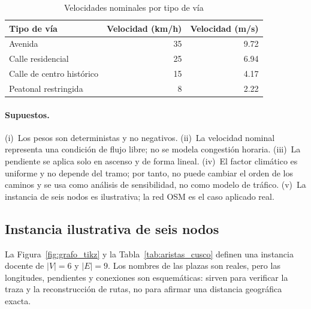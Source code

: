 \begin{table}[H]
    \centering
    \fontsize{9.5}{11.5}\selectfont
    \caption{Velocidades nominales por tipo de vía}
    \label{tab:velocidades}
    \begin{tabular}{@{}lrr@{}}
        \toprule
        \textbf{Tipo de vía} & \textbf{Velocidad (km/h)} & \textbf{Velocidad (m/s)} \\
        \midrule
        Avenida & 35 & 9.72 \\
        Calle residencial & 25 & 6.94 \\
        Calle de centro histórico & 15 & 4.17 \\
        Peatonal restringida & 8 & 2.22 \\
        \bottomrule
    \end{tabular}
\end{table}

\paragraph{Supuestos.} (i)~Los pesos son deterministas y no negativos. (ii)~La velocidad nominal representa una condición de flujo libre; no se modela congestión horaria. (iii)~La pendiente se aplica solo en ascenso y de forma lineal. (iv)~El factor climático es uniforme y no depende del tramo; por tanto, no puede cambiar el orden de los caminos y se usa como análisis de sensibilidad, no como modelo de tráfico. (v)~La instancia de seis nodos es ilustrativa; la red OSM es el caso aplicado real.

\subsection{Instancia ilustrativa de seis nodos}
La Figura~\ref{fig:grafo_tikz} y la Tabla~\ref{tab:aristas_cusco} definen una instancia docente de $|V|=6$ y $|E|=9$. Los nombres de las plazas son reales, pero las longitudes, pendientes y conexiones son esquemáticas: sirven para verificar la traza y la reconstrucción de rutas, no para afirmar una distancia geográfica exacta.

